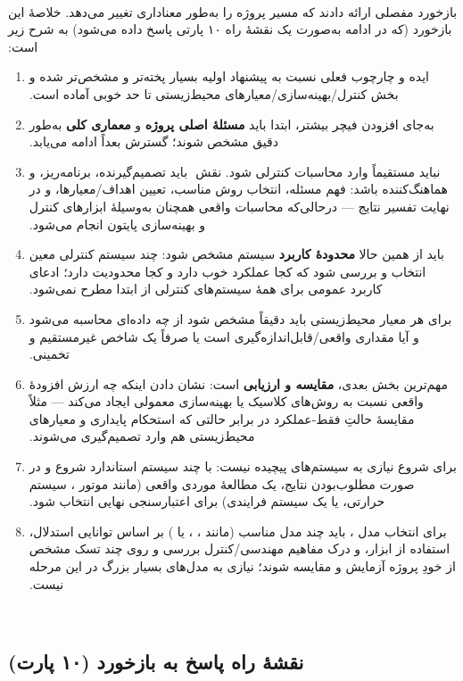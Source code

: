 ‫\documentclass[a4paper,12pt]{article}
\begin{document}
‫بازخورد مفصلی ارائه دادند که مسیر پروژه را به‌طور معناداری تغییر
‫می‌دهد. خلاصهٔ این بازخورد (که در ادامه به‌صورت یک نقشهٔ راه ۱۰
‫پارتی پاسخ داده می‌شود) به شرح زیر است:
‫
‫\begin{enumerate}
‫\item ایده و چارچوب فعلی نسبت به پیشنهاد اولیه بسیار پخته‌تر و
‫مشخص‌تر شده و بخش کنترل/بهینه‌سازی/معیارهای محیط‌زیستی تا حد خوبی
‫آماده است.
‫
‫\item به‌جای افزودن فیچر بیشتر، ابتدا باید \textbf{مسئلهٔ اصلی
‫پروژه} و \textbf{معماری کلی} به‌طور دقیق مشخص شوند؛ گسترش بعداً
‫ادامه می‌یابد.
‫
‫\item {} نباید مستقیماً وارد محاسبات کنترلی شود. نقش
‫ باید تصمیم‌گیرنده، برنامه‌ریز، و هماهنگ‌کننده باشد:
‫فهم مسئله، انتخاب روش مناسب، تعیین اهداف/معیارها، و در نهایت تفسیر
‫نتایج — درحالی‌که محاسبات واقعی همچنان به‌وسیلهٔ ابزارهای کنترل و
‫بهینه‌سازی پایتون انجام می‌شود.
‫
‫\item باید از همین حالا \textbf{محدودهٔ کاربرد} سیستم مشخص شود:
‫چند سیستم کنترلی معین انتخاب و بررسی شود که  کجا عملکرد
‫خوب دارد و کجا محدودیت دارد؛ ادعای کاربرد عمومی برای همهٔ سیستم‌های
‫کنترلی از ابتدا مطرح نمی‌شود.
‫
‫\item برای هر معیار محیط‌زیستی باید دقیقاً مشخص شود از چه داده‌ای
‫محاسبه می‌شود و آیا مقداری واقعی/قابل‌اندازه‌گیری است یا صرفاً یک
‫شاخص غیرمستقیم و تخمینی.
‫
‫\item مهم‌ترین بخش بعدی، \textbf{مقایسه و ارزیابی} است: نشان دادن
‫اینکه  چه ارزش افزودهٔ واقعی نسبت به روش‌های کلاسیک یا
‫بهینه‌سازی معمولی ایجاد می‌کند — مثلاً مقایسهٔ حالتِ فقط-عملکرد در
‫برابر حالتی که استحکام پایداری و معیارهای محیط‌زیستی هم وارد
‫تصمیم‌گیری می‌شوند.
‫
‫\item برای شروع نیازی به سیستم‌های پیچیده نیست: با چند سیستم
‫استاندارد شروع و در صورت مطلوب‌بودن نتایج، یک مطالعهٔ موردی واقعی
‫(مانند موتور ، سیستم حرارتی، یا یک سیستم فرایندی) برای
‫اعتبارسنجی نهایی انتخاب شود.
‫
‫\item برای انتخاب مدل ، باید چند مدل 
‫مناسب (مانند ، ، یا ) بر اساس
‫توانایی استدلال، استفاده از ابزار، و درک مفاهیم مهندسی/کنترل بررسی
‫و روی چند تسک مشخص از خودِ پروژه آزمایش و مقایسه شوند؛ نیازی به
‫مدل‌های بسیار بزرگ در این مرحله نیست.
‫\end{enumerate}
‫
‫\subsection*{نقشهٔ راه پاسخ به بازخورد (۱۰ پارت)}
\end{document}
